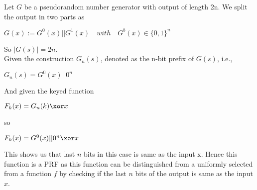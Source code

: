 Let $G$ be a pseudorandom number generator with output of length 2n. We split the output in two 
parts as 
\begin{center}
    $ G(x) := G^0(x) || G^1(x) \quad with \quad G^b(x) \in \{0,1\}^n $
\end{center}


So $ |G(s)| = 2n $.\\


Given the construction $ G_n(s) $, denoted as the n-bit prefix of $ G(s)$, i.e.,
\begin{center}
    $ G_n(s) =   G^0(x) || 0^n $
\end{center}

And given the keyed function
\begin{center}
    $ F_k(x) =   G_n(k) \xor x $
\end{center}

so
\begin{center}
    $ F_k(x) =   G^0(x) || 0^n \xor x $
\end{center}


This shows us that last $n$ bits in this case is same as the input x. Hence this function is a PRF as this function can 
be distinguished from a uniformly selected from a function $f$ by checking if the last $n$ bits of
the output is same as the input $x$.
